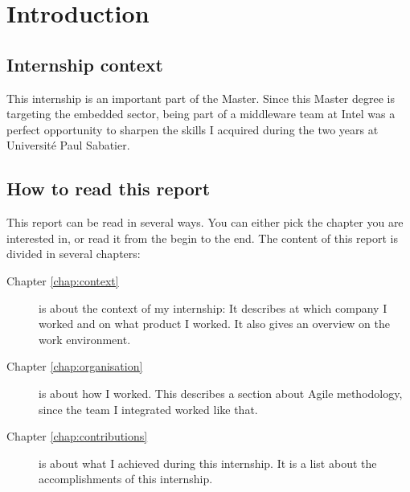 \chapter{Introduction}

\section{Internship context}
This internship is an important part of the  Master.
Since this Master degree is targeting the embedded sector, being part of a middleware team at Intel
was a perfect opportunity to sharpen the skills I acquired during the two years at Université Paul Sabatier.

\section{How to read this report}

This report can be read in several ways. You can either pick the chapter you are
interested in, or read it from the begin to the end. The content of this report
is divided in several chapters:

\begin{description}
    \item[Chapter \ref{chap:context}] is about the context of my internship: It describes at which company I worked and on what product I worked.
        It also gives an overview on the work environment.
    \item[Chapter \ref{chap:organisation}] is about how I worked. This describes a section about Agile methodology, since the
        team I integrated worked like that.
    \item[Chapter \ref{chap:contributions}] is about what I achieved during this internship. It is a list about the accomplishments
        of this internship.
\end{description}
